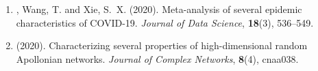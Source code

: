 \begin{enumerate}[resume=journalpubs]
\begin{cventry}
\par\end{cventry}
\item\begin{cventry} \PZ{}, Wang, T. and Xie, S.\ X. (2020). Meta-analysis of several epidemic characteristics of COVID-19. \emph{Journal of Data Science}, \textbf{18}(3), 536--549.

\par\end{cventry}
\item\begin{cventry} \PZ{} (2020). Characterizing several properties of high-dimensional random Apollonian networks. \emph{Journal of Complex Networks}, \textbf{8}(4), cnaa038.
\par\end{cventry}
\end{enumerate}
